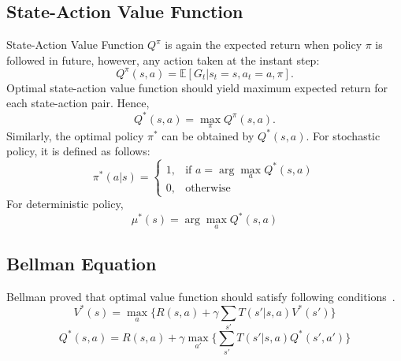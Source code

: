 \subsection{State-Action Value Function}

State-Action Value Function $Q^{\pi}$ is again the expected return when policy $\pi$ is followed in future, 
however, any action taken at the instant step:
\begin{equation}
Q^{\pi}(s,a) = \mathbb{E}[G_t|s_t=s, a_t=a, \pi]. %
\end{equation}
Optimal state-action value function should yield maximum expected return for each state-action pair. Hence,
\begin{equation}
Q^{*}(s,a) = \max_{\pi} Q^{\pi}(s,a).
\end{equation}
Similarly, the optimal policy $\pi^*$ can be obtained by $Q^{*}(s,a)$. For stochastic policy, it is defined as follows: 
\begin{equation}
\label{eqn:policy_stochastic_q}
\pi^{*}(a|s) = 
\begin{cases}
1,   & \text{if  } a = \arg\max_{a} Q^{*}(s,a) \\
0,   & \text{otherwise  }
\end{cases} 
\end{equation}
For deterministic policy, 
\begin{equation}
\label{eqn:policy_deterministic_q}
\mu^{*}(s) = \arg\max_{a} Q^{*}(s,a)
\end{equation}

\subsection{Bellman Equation}

Bellman proved that optimal value function should satisfy following conditions~\cite{bellman_dynamic_2003}. 
\begin{equation}
\label{eqn:bellman_v}
V^{*}(s) = \max_{a} \Big\{ R(s,a) + \gamma \sum_{s'} T(s'|s,a) V^{*}(s') \Big\}
\end{equation}
\begin{equation}
\label{eqn:bellman_q}
Q^{*}(s,a) = R(s,a) + \gamma \max_{a'} \Big\{ \sum_{s'} T(s'|s,a) Q^{*}(s',a') \Big\}
\end{equation}
